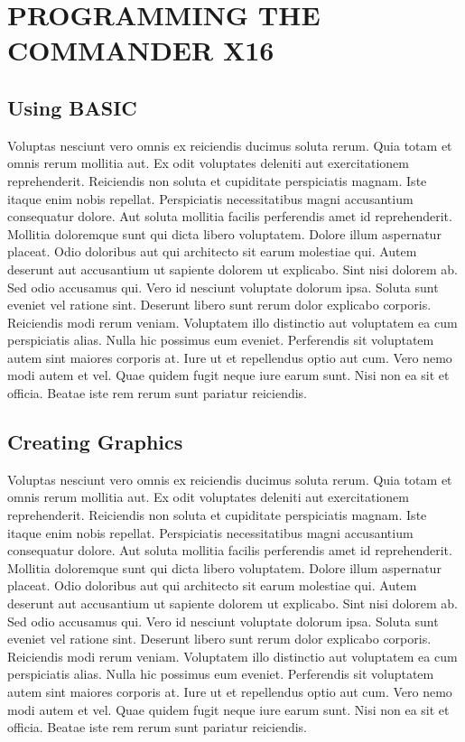 \documentclass[
	11pt, %
	fleqn, %
	letterpaper, %
]{CommodoreBlueBook}
\begin{document}
\makeatletter\@openrightfalse
\part{PROGRAMMING THE COMMANDER X16}

\chapter*{Using BASIC}

Voluptas nesciunt vero omnis ex reiciendis ducimus soluta rerum. Quia totam et
omnis rerum mollitia aut. Ex odit voluptates deleniti aut exercitationem
reprehenderit. Reiciendis non soluta et cupiditate perspiciatis magnam. Iste
itaque enim nobis repellat. Perspiciatis necessitatibus magni accusantium
consequatur dolore. Aut soluta mollitia facilis perferendis amet id
reprehenderit. Mollitia doloremque sunt qui dicta libero voluptatem. Dolore
illum aspernatur placeat. Odio doloribus aut qui architecto sit earum molestiae
qui. Autem deserunt aut accusantium ut sapiente dolorem ut explicabo. Sint nisi
dolorem ab. Sed odio accusamus qui. Vero id nesciunt voluptate dolorum ipsa.
Soluta sunt eveniet vel ratione sint. Deserunt libero sunt rerum dolor
explicabo corporis. Reiciendis modi rerum veniam. Voluptatem illo distinctio
aut voluptatem ea cum perspiciatis alias. Nulla hic possimus eum eveniet.
Perferendis sit voluptatem autem sint maiores corporis at. Iure ut et
repellendus optio aut cum. Vero nemo modi autem et vel. Quae quidem fugit neque
iure earum sunt. Nisi non ea sit et officia. Beatae iste rem rerum sunt
pariatur reiciendis.

\chapter*{Creating Graphics}

Voluptas nesciunt vero omnis ex reiciendis ducimus soluta rerum. Quia totam et
omnis rerum mollitia aut. Ex odit voluptates deleniti aut exercitationem
reprehenderit. Reiciendis non soluta et cupiditate perspiciatis magnam. Iste
itaque enim nobis repellat. Perspiciatis necessitatibus magni accusantium
consequatur dolore. Aut soluta mollitia facilis perferendis amet id
reprehenderit. Mollitia doloremque sunt qui dicta libero voluptatem. Dolore
illum aspernatur placeat. Odio doloribus aut qui architecto sit earum molestiae
qui. Autem deserunt aut accusantium ut sapiente dolorem ut explicabo. Sint nisi
dolorem ab. Sed odio accusamus qui. Vero id nesciunt voluptate dolorum ipsa.
Soluta sunt eveniet vel ratione sint. Deserunt libero sunt rerum dolor
explicabo corporis. Reiciendis modi rerum veniam. Voluptatem illo distinctio
aut voluptatem ea cum perspiciatis alias. Nulla hic possimus eum eveniet.
Perferendis sit voluptatem autem sint maiores corporis at. Iure ut et
repellendus optio aut cum. Vero nemo modi autem et vel. Quae quidem fugit neque
iure earum sunt. Nisi non ea sit et officia. Beatae iste rem rerum sunt
pariatur reiciendis.
\end{document}
